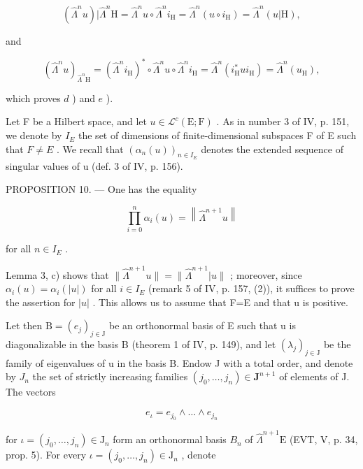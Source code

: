 \[
(\widehat {\Lambda} ^ {n} u) | \widehat {\Lambda} ^ {n} \mathrm{H} = \widehat {\Lambda} ^ {n} u \circ \widehat {\Lambda} ^ {n} i _ {\mathrm{H}} = \widehat {\Lambda} ^ {n} (u \circ i _ {\mathrm{H}}) = \widehat {\Lambda} ^ {n} (u | \mathrm{H}),
\]

and

\[
(\widehat {\Lambda} ^ {n} u) _ {\widehat {\Lambda} ^ {n} \mathrm{H}} = (\widehat {\Lambda} ^ {n} i _ {\mathrm{H}}) ^ {*} \circ \widehat {\Lambda} ^ {n} u \circ \widehat {\Lambda} ^ {n} i _ {\mathrm{H}} = \widehat {\Lambda} ^ {n} (i _ {\mathrm{H}} ^ {*} u i _ {\mathrm{H}}) = \widehat {\Lambda} ^ {n} (u _ {\mathrm{H}}),
\]

which proves \(d\) ) and \(e\) ).

Let F be a Hilbert space, and let \(u \in \mathcal{L}^{c}(\mathrm{E};\mathrm{F})\) . As in number 3 of IV, p. 151, we denote by \(I_{E}\) the set of dimensions of finite-dimensional subspaces F of E such that \(F \neq E\) . We recall that \((\alpha_{n}(u))_{n \in I_{E}}\) denotes the extended sequence of singular values of u (def. 3 of IV, p. 156).

PROPOSITION 10. --- One has the equality

\[
\prod_ {i = 0} ^ {n} \alpha_ {i} (u) = \left\| \widehat {\Lambda} ^ {n + 1} u \right\|
\]

for all \(n \in I_{E}\) .

Lemma 3, c) shows that \(\|\widehat{\Lambda}^{n+1}u\|=\|\widehat{\Lambda}^{n+1}|u\|\) ; moreover, since \(\alpha_{i}(u)=\alpha_{i}(|u|)\) for all \(i\in I_{E}\) (remark 5 of IV, p. 157, (2)), it suffices to prove the assertion for \(|u|\) . This allows us to assume that F=E and that u is positive.

Let then \(\mathrm{B}=(e_{j})_{j\in\mathrm{J}}\) be an orthonormal basis of E such that u is diagonalizable in the basis B (theorem 1 of IV, p. 149), and let \((\lambda_{j})_{j\in\mathrm{J}}\) be the family of eigenvalues of u in the basis B. Endow J with a total order, and denote by \(J_{n}\) the set of strictly increasing families \((j_{0},\ldots,j_{n})\in\mathbf{J}^{n+1}\) of elements of J. The vectors

\[
e _ {\iota} = e _ {j _ {0}} \wedge \dots \wedge e _ {j _ {n}}
\]

for \(\iota=(j_{0},\ldots,j_{n})\in\mathrm{J}_{n}\) form an orthonormal basis \(B_{n}\) of \(\widehat{\Lambda}^{n+1}\mathrm{E}\) (EVT, V, p. 34, prop. 5). For every \(\iota=(j_{0},\ldots,j_{n})\in\mathrm{J}_{n}\) , denote

